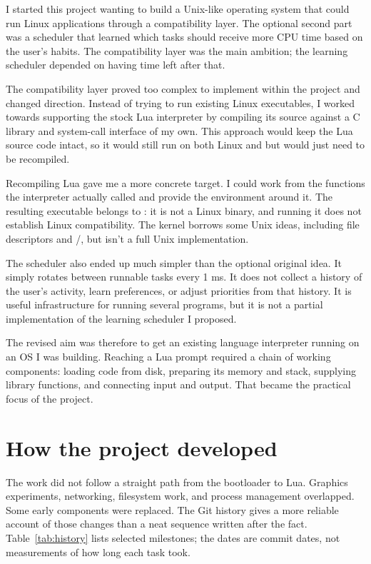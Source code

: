 \documentclass[11pt,a4paper]{scrartcl}
\newcommand{\code}[1]{\texttt{\detokenize{#1}}}
\begin{document}
I started this project wanting to build a Unix-like operating system that
could run Linux applications through a compatibility layer. The optional
second part was a scheduler that learned which tasks should receive more
CPU time based on the user's habits. The compatibility layer was the main
ambition; the learning scheduler depended on having time left after that.

The compatibility layer proved too complex to implement within the project and
changed direction. Instead of trying to run existing Linux executables,
I worked towards supporting the stock Lua interpreter by compiling its
source against a C library and system-call interface of my own. This
approach would keep the Lua source code intact, so it would still run
on both Linux and \code{mboot} but would just need to be recompiled.

Recompiling Lua gave me a more concrete target. I could work from the
functions the interpreter actually called and provide the environment
around it. The resulting executable belongs to \code{mboot}: it is not
a Linux binary, and running it does not establish Linux compatibility.
The kernel borrows some Unix ideas, including file descriptors and
\code{fork}/\code{exec}, but \code{mboot} isn't a full Unix implementation.

The scheduler also ended up much simpler than the optional original idea.
It simply rotates between runnable tasks every 1 ms. It does not collect
a history of the user's activity, learn preferences, or adjust priorities
from that history. It is useful infrastructure for running several programs,
but it is not a partial implementation of the learning scheduler I proposed.

The revised aim was therefore to get an existing language interpreter
running on an OS I was building. Reaching a Lua prompt required a chain
of working components: loading code from disk, preparing its memory and
stack, supplying library functions, and connecting input and output.
That became the practical focus of the project.


\section{How the project developed}
\label{sec:history}

The work did not follow a straight path from the bootloader to Lua.
Graphics experiments, networking, filesystem work, and process management
overlapped. Some early components were replaced. The Git history gives a
more reliable account of those changes than a neat sequence written after
the fact. Table~\ref{tab:history} lists selected milestones; the dates are
commit dates, not measurements of how long each task took.
\end{document}
